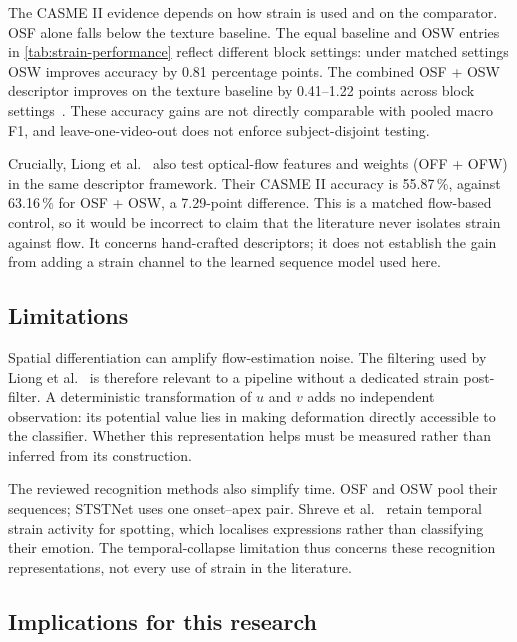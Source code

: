 The CASME II evidence depends on how strain is used and on the comparator. OSF alone falls below the texture baseline. The equal baseline and OSW entries in \autoref{tab:strain-performance} reflect different block settings: under matched settings OSW improves accuracy by 0.81 percentage points. The combined OSF + OSW descriptor improves on the texture baseline by 0.41--1.22 points across block settings~\cite{liong2016}. These accuracy gains are not directly comparable with pooled macro F1, and leave-one-video-out does not enforce subject-disjoint testing.

Crucially, Liong et al.~\cite{liong2016} also test optical-flow features and weights (OFF + OFW) in the same descriptor framework. Their CASME II accuracy is 55.87\,\%, against 63.16\,\% for OSF + OSW, a 7.29-point difference. This is a matched flow-based control, so it would be incorrect to claim that the literature never isolates strain against flow. It concerns hand-crafted descriptors; it does not establish the gain from adding a strain channel to the learned sequence model used here.

\subsection{Limitations}
\label{sec:strain-limitations}

Spatial differentiation can amplify flow-estimation noise. The filtering used by Liong et al.~\cite{liong2014a,liong2016} is therefore relevant to a pipeline without a dedicated strain post-filter. A deterministic transformation of $u$ and $v$ adds no independent observation: its potential value lies in making deformation directly accessible to the classifier. Whether this representation helps must be measured rather than inferred from its construction.

The reviewed recognition methods also simplify time. OSF and OSW pool their sequences; STSTNet uses one onset--apex pair. Shreve et al.~\cite{shreve2011} retain temporal strain activity for spotting, which localises expressions rather than classifying their emotion. The temporal-collapse limitation thus concerns these recognition representations, not every use of strain in the literature.

\subsection{Implications for this research}
\label{sec:strain-implications}

